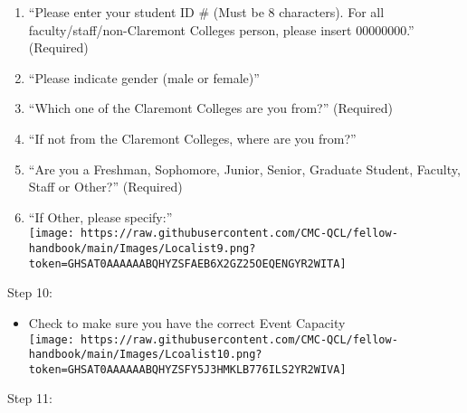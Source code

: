 \documentclass[
]{book}
\providecommand{\tightlist}{%
  \setlength{\itemsep}{0pt}\setlength{\parskip}{0pt}}
\begin{document}
\begin{enumerate}
\def\labelenumi{\arabic{enumi}.}
\tightlist
\item
  ``Please enter your student ID \# (Must be 8 characters). For all faculty/staff/non-Claremont Colleges person, please insert 00000000.'' (Required)\\
\item
  ``Please indicate gender (male or female)''\\
\item
  ``Which one of the Claremont Colleges are you from?'' (Required)\\
\item
  ``If not from the Claremont Colleges, where are you from?''\\
\item
  ``Are you a Freshman, Sophomore, Junior, Senior, Graduate Student, Faculty, Staff or Other?'' (Required)\\
\item
  ``If Other, please specify:''\\
  \texttt{[image: https://raw.githubusercontent.com/CMC-QCL/fellow-handbook/main/Images/Localist9.png?token=GHSAT0AAAAAABQHYZSFAEB6X2GZ25OEQENGYR2WITA]}
\end{enumerate}

Step 10:

\begin{itemize}
\tightlist
\item
  Check to make sure you have the correct Event Capacity\\
  \texttt{[image: https://raw.githubusercontent.com/CMC-QCL/fellow-handbook/main/Images/Lcoalist10.png?token=GHSAT0AAAAAABQHYZSFY5J3HMKLB776ILS2YR2WIVA]}
\end{itemize}

Step 11:
\end{document}
